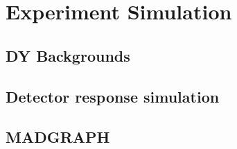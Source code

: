 \chapter{Experiment Simulation}
\label{simulation_chapter}
\section{DY Backgrounds}

\section{Detector response simulation}

\section{MADGRAPH}


